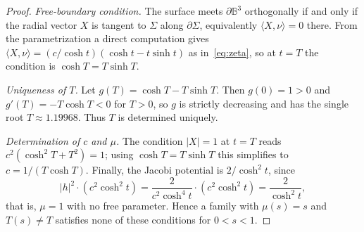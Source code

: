 \documentclass[10pt,a4paper]{amsart}
\begin{document}
\begin{proof}
	\emph{Free-boundary condition.} The surface meets $\partial\mathbb{B}^3$ orthogonally if and only if the radial vector $X$ is tangent to $\Sigma$ along $\partial\Sigma$, equivalently $\langle X, \nu\rangle = 0$ there. From the parametrization a direct computation gives $\langle X, \nu\rangle = (c/\cosh t)(\cosh t - t\sinh t)$ as in~\eqref{eq:zeta}, so at $t = T$ the condition is $\cosh T = T\sinh T$.

	\emph{Uniqueness of $T$.} Let $g(T) = \cosh T - T\sinh T$. Then $g(0) = 1 > 0$ and $g'(T) = -T\cosh T < 0$ for $T > 0$, so $g$ is strictly decreasing and has the single root $T \approx 1.19968$. Thus $T$ is determined uniquely.

	\emph{Determination of $c$ and $\mu$.} The condition $|X| = 1$ at $t = T$ reads $c^2(\cosh^2 T + T^2) = 1$; using $\cosh T = T\sinh T$ this simplifies to $c = 1/(T\cosh T)$. Finally, the Jacobi potential is $2/\cosh^2 t$, since
	\begin{equation}
		|h|^2 \cdot (c^2\cosh^2 t) = \frac{2}{c^2\cosh^4 t}\cdot(c^2\cosh^2 t) = \frac{2}{\cosh^2 t},
	\end{equation}
	that is, $\mu = 1$ with no free parameter. Hence a family with $\mu(s) = s$ and $T(s)\neq T$ satisfies none of these conditions for $0 < s < 1$.
\end{proof}
\end{document}
